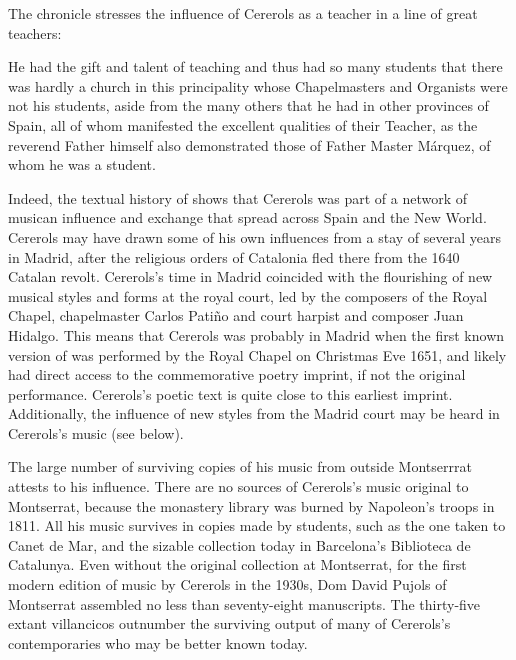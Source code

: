 The chronicle stresses the influence of Cererols as a teacher in a line of great
teachers:
\begin{quoting}
    He had the gift and talent of teaching and thus had so many students that
    there was hardly a church in this principality  whose
    Chapelmasters and Organists were not his students, aside from the many
    others that he had in other provinces of Spain, all of whom manifested the
    excellent qualities of their Teacher, as the reverend Father himself also
    demonstrated those of Father Master Márquez, of whom he  was a
    student.%
    \Autocite[7, note 2]{Estrada:CererolsBio}
\end{quoting}
Indeed, the textual history of  shows that Cererols
was part of a network of musican influence and exchange that spread across Spain
and the New World. 
Cererols may have drawn some of his own influences from a stay of several years
in Madrid, after the religious orders of Catalonia fled there from the 1640
Catalan revolt.
Cererols's time in Madrid coincided with the flourishing of new musical styles
and forms at the royal court, led by the composers of the Royal Chapel,
chapelmaster Carlos Patiño and court harpist and composer Juan Hidalgo.%
    \Autocites
    {Stein:Songs}
    {Rodriguez:Villancico} %
This means that Cererols was probably in Madrid when the first known version of
 was performed by the Royal Chapel on Christmas Eve
1651, and likely had direct access to the commemorative poetry imprint, if not
the original performance.
Cererols's poetic text is quite close to this earliest imprint.
Additionally, the influence of new styles from the Madrid court may be heard in
Cererols's music (see below).

The large number of surviving copies of his music from outside Montserrrat
attests to his influence.
There are no sources of Cererols's music original to Montserrat, because the
monastery library was burned by Napoleon's troops in 1811.%
All his music survives in copies made by students, such as the one taken to
Canet de Mar, and the sizable collection today in Barcelona's Biblioteca de
Catalunya.
Even without the original collection at Montserrat, for the first modern edition
of music by Cererols in the 1930s, Dom David Pujols of Montserrat assembled no
less than seventy-eight manuscripts.%
    \Autocite{Cererols:MEM-VC}
The thirty-five extant villancicos outnumber the surviving output of many of
Cererols's contemporaries who may be better known today.\XXX[who?]

